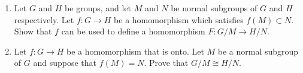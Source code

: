 {\begin{enumerate}
 
 
% 
%
% 

 
\item
Let $G$ and $H$ be groups, and let $M$ and $N$ be normal subgroups
of $G$ and $H$ respectively. Let $f : G \rightarrow H$ be a
homomorphism which satisfies $f(M) \subset
N$. Show that $f$  can be used to define a homomorphism
$F : G/M \rightarrow H/N$. 
 
 
 
 
 
\item
Let $f : G \rightarrow H$ be a  homomorphism that is onto.
Let $M$ be a normal subgroup of $G$ and suppose that $f(M) =
N$.  Prove that $G/M \cong H/N$.
 
  
%
%
 

\end{enumerate}}
